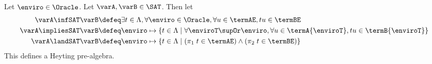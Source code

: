 \begingroup
{}
\begin{proposition}
\label{app:SAT}
  Let $\enviro \in \Oracle$.
  Let $\varA,\varB \in \SAT$. Then let
  \begin{align*}
    \varA \infSAT \varB &\defeq \exists t \in \Lambda, \forall \enviro \in \Oracle, \forall u \in \termAE, tu \in \termBE\\
    \varA \impliesSAT \varB &\defeq \enviro \mapsto \{ t \in \Lambda \mid \forall \enviroT \supOr \enviro, \forall u \in \termA{\enviroT}, tu \in \termB{\enviroT}\}\\
    \varA\landSAT\varB &\defeq \enviro \mapsto \{ t \in \Lambda \mid (\pi_1\;t\in \termAE) \land (\pi_2\;t \in \termBE)\}
  \end{align*}
  This defines a Heyting pre-algebra.
\end{proposition}
\endgroup
